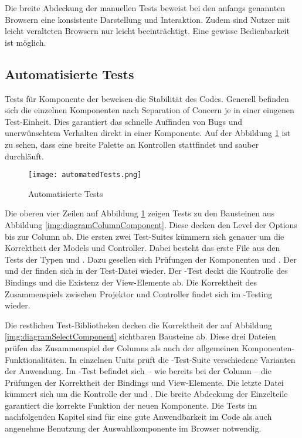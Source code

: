 Die breite Abdeckung der manuellen Tests beweist bei den anfangs genannten Browsern eine konsistente Darstellung und Interaktion. 
Zudem sind Nutzer mit leicht veralteten Browsern nur leicht beeinträchtigt. 
Eine gewisse Bedienbarkeit ist möglich. 


\subsection{Automatisierte Tests}
\label{sec:automatedTests}

Tests für Komponente der  beweisen die Stabilität des Codes. 
Generell befinden sich die einzelnen Komponenten nach Separation of Concern je in einer eingenen Test-Einheit. 
Dies garantiert das schnelle Auffinden von Bugs und unerwünschtem Verhalten direkt in einer Komponente. 
Auf der Abbildung \ref{img:automatedTests} ist zu sehen, dass eine breite Palette an Kontrollen stattfindet und sauber durchläuft. 

\begin{figure}[!htb]
    \centering
    \texttt{[image: automatedTests.png]}
    \caption{\centering Automatisierte Tests}
    \label{img:automatedTests}
\end{figure}

Die oberen vier Zeilen auf Abbildung \ref{img:automatedTests} zeigen Tests zu den Bausteinen aus Abbildung \ref{img:diagramColumnComponent}. 
Diese decken den Level der Options bis zur Column ab. 
Die ersten zwei Test-Suites kümmern sich genauer um die Korrektheit der Models und Controller. 
Dabei besteht das erste File aus den Tests der Typen  und . 
Dazu gesellen sich Prüfungen der Komponenten  und . 
Der  und der  finden sich in der Test-Datei wieder. 
Der -Test deckt die Kontrolle des Bindings und die Existenz der View-Elemente ab. 
Die Korrektheit des Zusammenspiels zwischen Projektor und Controller findet sich im -Testing wieder. 

Die restlichen Test-Bibliotheken decken die Korrektheit der auf Abbildung \ref{img:diagramSelectComponent} sichtbaren Bausteine ab. 
Diese drei Dateien prüfen das Zusammenspiel der Columns als auch der allgemeinen Komponenten-Funktionalitäten. 
In einzelnen Units prüft die -Test-Suite verschiedene Varianten der Anwendung. 
Im -Test befindet sich – wie bereits bei der Column – die Prüfungen der Korrektheit der Bindings und View-Elemente. 
Die letzte Datei kümmert sich um die Kontrolle der  und . 
Die breite Abdeckung der Einzelteile garantiert die korrekte Funktion der neuen Komponente. 
Die Tests im nachfolgenden Kapitel sind für eine gute Anwendbarkeit im Code als auch angenehme Benutzung der Auswahlkomponente im Browser notwendig. 


